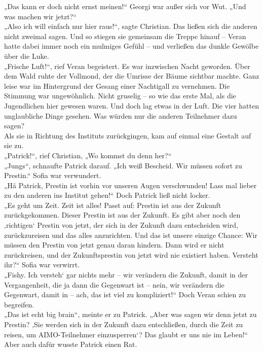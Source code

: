 \documentclass[oneside]{memoir}
\begin{document}
„Das kann er doch nicht ernst meinen!“ Georgi war außer sich vor Wut. „Und was machen wir jetzt?“ \\
„Also ich will einfach nur hier raus!“, sagte Christian.
Das ließen sich die anderen nicht zweimal sagen. Und so stiegen sie gemeinsam die Treppe hinauf -- Veran hatte dabei immer noch ein mulmiges Gefühl -- und verließen das dunkle Gewölbe über die Luke. \\
„Frische Luft!“, rief Veran begeistert.
Es war inzwischen Nacht geworden. Über dem Wald ruhte der Vollmond, der die Umrisse der Bäume sichtbar machte. Ganz leise war im Hintergrund der Gesang einer Nachtigall zu vernehmen.
Die Stimmung war ungewöhnlich. Nicht gruselig – so wie das erste Mal, als die Jugendlichen hier gewesen waren. Und doch lag etwas in der Luft. Die vier hatten unglaubliche Dinge gesehen. Was würden nur die anderen Teilnehmer dazu sagen? \\
Als sie in Richtung des Instituts zurückgingen, kam auf einmal eine Gestalt auf sie zu. \\
„Patrick!“, rief Christian, „Wo kommst du denn her?“ \\
„Jungs“, schnaufte Patrick darauf. „Ich weiß Bescheid. Wir müssen sofort zu Prestin.“
Sofia war verwundert. \\ „Hä Patrick, Prestin ist vorhin vor unseren Augen verschwunden! Lass mal lieber zu den anderen ins Institut gehen!“
Doch Patrick ließ nicht locker.  \\
„Es geht um Zeit. Zeit ist alles! Passt auf: Prestin ist aus der Zukunft zurückgekommen. Dieser Prestin ist aus der Zukunft. Es gibt aber noch den ‚richtigen‘ Prestin von jetzt, der sich in der Zukunft dazu entscheiden wird, zurückzureisen und das alles anzurichten. Und das ist unsere einzige Chance: Wir müssen den Prestin von jetzt genau daran hindern. Dann wird er nicht zurückreisen, und der Zukunftsprestin von jetzt wird nie existiert haben. Versteht ihr?“
Sofia war verwirrt. \\
„Fishy. Ich versteh‘ gar nichts mehr – wir verändern die Zukunft, damit in der Vergangenheit, die ja dann die Gegenwart ist – nein, wir verändern die Gegenwart, damit in – ach, das ist viel zu kompliziert!“
Doch Veran schien zu begreifen. \\
„Das ist echt big brain“, meinte er zu Patrick. „Aber was sagen wir denn jetzt zu Prestin? ‚Sie werden sich in der Zukunft dazu entschließen, durch die Zeit zu reisen, um AIMO-Teilnehmer einzusperren‘? Das glaubt er uns nie im Leben!“
Aber auch dafür wusste Patrick einen Rat. \\
\end{document}
